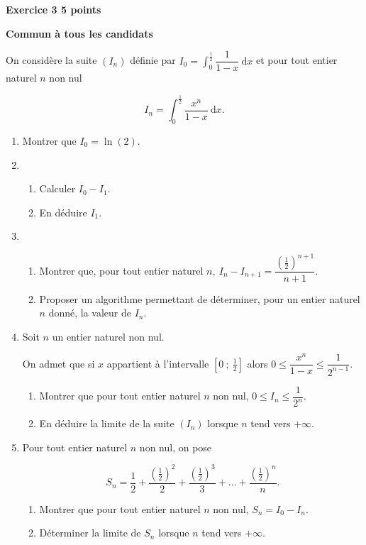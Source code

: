 \documentclass{cornouaille}
\begin{document}
\begin{exercice}[Polynésie 2019]
\textbf{Exercice 3 \hfill  5 points}

\textbf{Commun à  tous les candidats}

\medskip

On considère la suite $\left(I_n\right)$ définie par $I_0 = \displaystyle\int_0^{\frac{1}{2}}\dfrac{1}{1 - x}\:\text{d}x$ et pour tout entier naturel $n$ non nul 

 \[I_n = \displaystyle\int_0^{\frac{1}{2}}\dfrac{x^n}{1 - x}\:\text{d}x.\]

\smallskip

\begin{enumerate}
\item Montrer que $I_0 = \ln (2)$. 
\item  
	\begin{enumerate}
		\item Calculer $I_0 - I_1$.
		\item En déduire $I_1$.  
	\end{enumerate}
\item 
	\begin{enumerate}
		\item Montrer que, pour tout entier naturel $n,\: I_n - I_{n+1} = \dfrac{\left(\frac{1}{2} \right)^{n+1}}{n+1}$. 
		\item Proposer un algorithme permettant de déterminer, pour un entier naturel $n$ donné, la valeur de $I_n$. 
	\end{enumerate}
\item Soit $n$ un entier naturel non nul. 

On admet que si $x$ appartient à l'intervalle $\left[0~;~\frac{1}{2}\right]$ alors $0 \leqslant \dfrac{x^n}{1 - x} \leqslant \dfrac{1}{2^{n-1}}$. 

	\begin{enumerate}
		\item Montrer que pour tout entier naturel $n$ non nul, $0 \leqslant  I_n \leqslant \dfrac{1}{2^n}$.
		\item En déduire la limite de la suite $\left(I_n\right)$ lorsque $n$ tend vers $+\infty$. 
	\end{enumerate}
\item Pour tout entier naturel $n$ non nul, on pose 

\[S_n = \dfrac{1}{2} + \dfrac{\left(\frac{1}{2} \right)^2}{2} + \dfrac{\left(\frac{1}{2} \right)^3}{3} + \ldots +\dfrac{\left( \frac{1}{2}\right)^n}{n}. \]

	\begin{enumerate}
		\item Montrer que pour tout entier naturel $n$ non nul, $S_n = I_0 - I_n$. 
		\item Déterminer la limite de $S_n$ lorsque $n$ tend vers $+\infty$. 
	\end{enumerate}
\end{enumerate}
\end{exercice}
\end{document}
